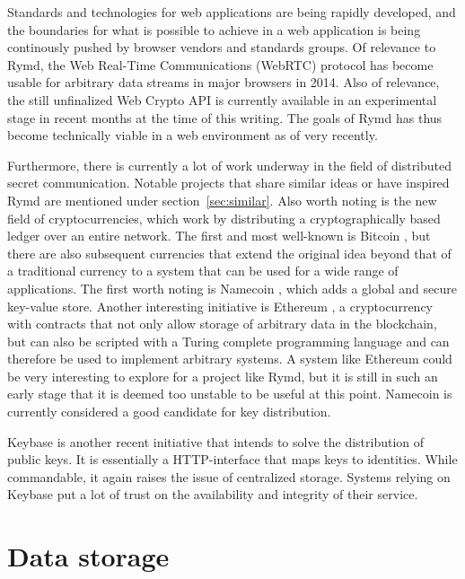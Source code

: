 Standards and technologies for web applications are being rapidly developed, and the boundaries for what is possible to achieve in a web application is being continously pushed by browser vendors and standards groups. Of relevance to Rymd, the Web Real-Time Communications (WebRTC) protocol \cite{WebRTC:Online} has become usable for arbitrary data streams in major browsers in 2014. Also of relevance, the still unfinalized Web Crypto API \cite{WebCrypto:Online} is currently available in an experimental stage in recent months at the time of this writing. The goals of Rymd has thus become technically viable in a web environment as of very recently.

Furthermore, there is currently a lot of work underway in the field of distributed secret communication. Notable projects that share similar ideas or have inspired Rymd are mentioned under section~\ref{sec:similar}. Also worth noting is the new field of cryptocurrencies, which work by distributing a cryptographically based ledger over an entire network. The first and most well-known is Bitcoin \cite{Bitcoin:Online}, but there are also subsequent currencies that extend the original idea beyond that of a traditional currency to a system that can be used for a wide range of applications. The first worth noting is Namecoin \cite{Namecoin:Online}, which adds a global and secure key-value store. Another interesting initiative is Ethereum \cite{Ethereum:Online}, a cryptocurrency with contracts that not only allow storage of arbitrary data in the blockchain, but can also be scripted with a Turing complete programming language and can therefore be used to implement arbitrary systems. A system like Ethereum could be very interesting to explore for a project like Rymd, but it is still in such an early stage that it is deemed too unstable to be useful at this point. Namecoin is currently considered a good candidate for key distribution.

Keybase \cite{Keybase:Online} is another recent initiative that intends to solve the distribution of public keys. It is essentially a HTTP-interface that maps keys to identities. While commandable, it again raises the issue of centralized storage. Systems relying on Keybase put a lot of trust on the availability and integrity of their service.


\section{Data storage}
\label{sec:datastorage}

